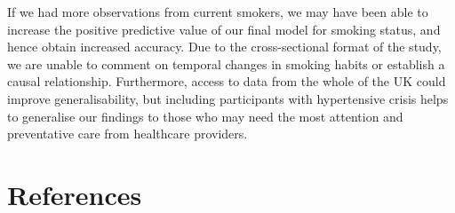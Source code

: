 \documentclass[
  11pt,
  twocolumn]{article}
\begin{document}
If we had more observations from current smokers, we may have been able
to increase the positive predictive value of our final model for smoking
status, and hence obtain increased accuracy. Due to the cross-sectional
format of the study, we are unable to comment on temporal changes in
smoking habits or establish a causal relationship. Furthermore, access
to data from the whole of the UK could improve generalisability, but
including participants with hypertensive crisis helps to generalise our
findings to those who may need the most attention and preventative care
from healthcare providers.

\clearpage
\onecolumn

\hypertarget{references}{%
\section*{References}\label{references}}
\end{document}
